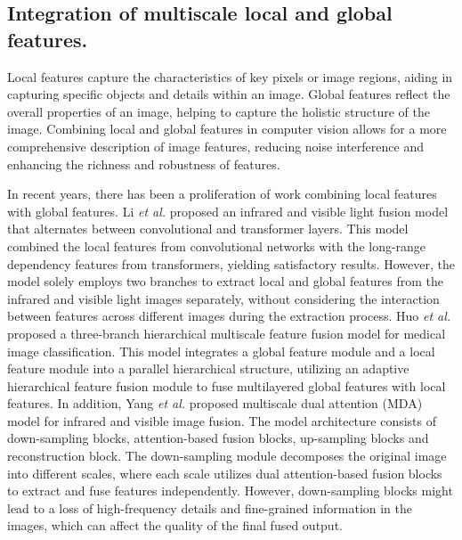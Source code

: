 \subsection{Integration of multiscale local and global features.}
Local features capture the characteristics of key pixels or image regions, aiding in capturing specific objects and details within an image. Global features reflect the overall properties of an image, helping to capture the holistic structure of the image. Combining local and global features in computer vision allows for a more comprehensive description of image features, reducing noise interference and enhancing the richness and robustness of features.

In recent years, there has been a proliferation of work combining local features with global features.
Li \textit{et al.} \cite{li2022cgtf} proposed an infrared and visible light fusion model that alternates between convolutional and transformer layers.
This model combined the local features from convolutional networks with the long-range dependency features from transformers, yielding satisfactory results.
However, the model solely employs two branches to extract local and global features from the infrared and visible light images separately, without considering the interaction between features across different images during the extraction process.
Huo \textit{et al.} \cite{huo2024hifuse} proposed a three-branch hierarchical multiscale feature fusion model for medical image classification.
This model integrates a global feature module and a local feature module into a parallel hierarchical structure, utilizing an adaptive hierarchical feature fusion module to fuse multilayered global features with local features.
In addition, Yang \textit{et al.} \cite{yang2024multi} proposed multiscale dual attention (MDA) model for infrared and visible image fusion.
The model architecture consists of down-sampling blocks, attention-based fusion blocks, up-sampling blocks and reconstruction block.
The down-sampling module decomposes the original image into different scales, where each scale utilizes dual attention-based fusion blocks to extract and fuse features independently.
However, down-sampling blocks might lead to a loss of high-frequency details and fine-grained information in the images, which can affect the quality of the final fused output.